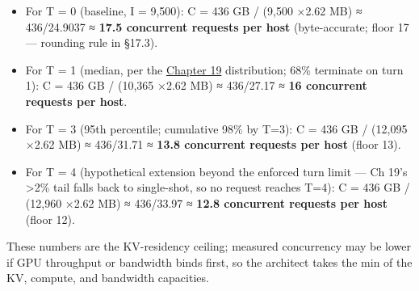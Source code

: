 \begin{itemize}
\tightlist
\item
  For T = 0 (baseline, I = 9,500): C = 436 GB / (9,500 ×2.62 MB) ≈
  436/24.9037 ≈ \textbf{17.5 concurrent requests per host}
  (byte-accurate; floor 17 --- rounding rule in §17.3).
\item
  For T = 1 (median, per the \hyperref[chap:19]{Chapter 19} distribution; 68\% terminate on
  turn 1): C = 436 GB / (10,365 ×2.62 MB) ≈ 436/27.17 ≈ \textbf{16
  concurrent requests per host}.
\item
  For T = 3 (95th percentile; cumulative 98\% by T=3): C = 436 GB /
  (12,095 ×2.62 MB) ≈ 436/31.71 ≈ \textbf{13.8 concurrent requests per
  host} (floor 13).
\item
  For T = 4 (hypothetical extension beyond the enforced turn limit ---
  Ch 19's \textgreater2\% tail falls back to single-shot, so no request
  reaches T=4): C = 436 GB / (12,960 ×2.62 MB) ≈ 436/33.97 ≈
  \textbf{12.8 concurrent requests per host} (floor 12).
\end{itemize}

These numbers are the KV-residency ceiling; measured concurrency may be
lower if GPU throughput or bandwidth binds first, so the architect takes
the min of the KV, compute, and bandwidth capacities.

